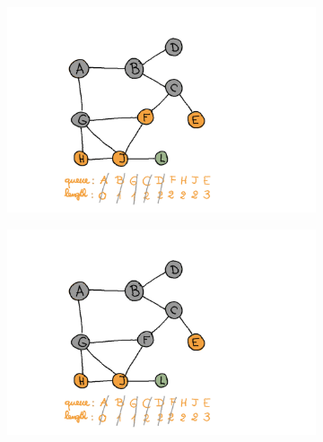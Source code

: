\begin{enumerate}[(a)]
\begin{figure}[H]
\begin{subfigure}[h]{0.45\textwidth}
    \end{subfigure}
    \vspace{5mm}
    \qquad
    \begin{subfigure}[h]{0.45\textwidth}
    \raggedleft
    \includegraphics[width=\textwidth]{Pictures/SP/panda_gebissen_5.png}
    \end{subfigure}
    \vspace{5mm}
    \centering
    \begin{subfigure}[h]{0.45\textwidth}
    \raggedright
    \includegraphics[width=\textwidth]{Pictures/SP/panda_gebissen_6.png}
    \end{subfigure}
    \qquad
    \begin{subfigure}[h]{0.45\textwidth}
    \raggedleft

\end{subfigure}
\end{figure}
\end{enumerate}
